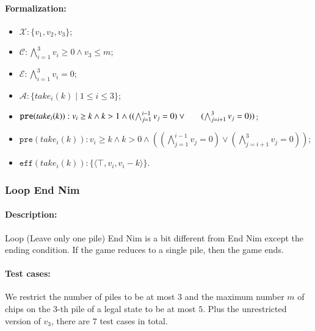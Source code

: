 \documentclass[review]{elsarticle}
\newcommand{\set}[1]{\{ #1 \}}
\newcommand{\tuple}[1]{\langle {#1} \rangle}
\newcommand{\true}{\top}
\newcommand{\statevar}{\mathcal{X}}
\newcommand{\act}{\mathcal{A}}
\newcommand{\constraint}{\mathcal{C}}
\newcommand{\estate}{\mathcal{E}}
\newcommand{\pre}{\mathtt{pre}}
\newcommand{\eff}{\mathtt{eff}}
\begin{document}
\paragraph{Formalization:}
\begin{itemize}
	\item $\statevar: \set{v_1, v_2 ,v_3}$;
	\item $\constraint:\bigwedge_{i=1}^{3} v_i \ge 0 \wedge v_3 \le m$;
	\item $\estate: \bigwedge_{i=1}^{3} v_i = 0$;
	\item $\act:\set{take_i(k) {\mid} 1 \le i \le 3}$;
	\item $\pre(take_i(k)) : v_i \ge k \wedge k > 1 \wedge ((\bigwedge_{j=1}^{i-1}v_j = 0 )\vee \\ \hspace*{6mm}
	(\bigwedge_{j=i+1}^{3}v_j = 0))$;
	\item {\color{red}$\pre(take_i(k)) : v_i \ge k \wedge k > 0 \wedge ((\bigwedge_{j=1}^{i-1} v_j = 0) \vee (\bigwedge_{j=i+1}^{3} v_j = 0))$;}
	\item $\eff(take_i(k)) : \set{\tuple{\true,v_i,v_i -k}}$.
\end{itemize}

\subsubsection{Loop End Nim \protect\cite{AlbN2001}}

\paragraph{Description:} 
Loop (Leave only one pile) End Nim is a bit different from End Nim except the ending condition. 
If the game reduces to a single pile, then the game ends. 
\paragraph{Test cases:}
We restrict the number of piles to be at most $3$ and the maximum number $m$ of chips on the $3$-th pile of a legal state to be at most $5$.
Plus the unrestricted version of $v_3$, there are $7$ test cases in total.
\end{document}
